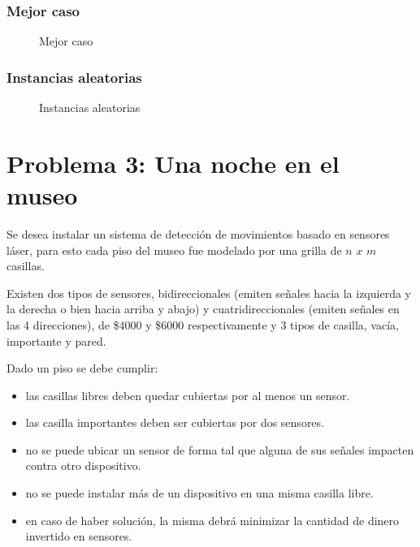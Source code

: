 \documentclass[a4paper, 10pt, twoside]{article}
\newcommand{\tresgraficos}[3]{
    \newcommand{\separacion}{-2.2em}
    \vspace{\separacion}
    
    \vspace{\separacion}
    
    \vspace{\separacion}
    
}
\begin{document}
\subsubsection{Mejor caso}

\begin{figure}[H]
  \centering
  \tresgraficos{problema2-mejor-caso}
               {problema2-mejor-caso-logn}
               {problema2-mejor-caso-n}
  \caption{Mejor caso}
\end{figure}


\subsubsection{Instancias aleatorias}

\begin{figure}[H]
  \centering
  \tresgraficos{problema2-instancias-aleatorias}
               {problema2-instancias-aleatorias-logn}
               {problema2-instancias-aleatorias-n}
  \caption{Instancias aleatorias}
\end{figure}




\newpage

\section{Problema 3: Una noche en el museo}
Se desea instalar un sistema de detección de movimientos basado en sensores láser, para esto cada piso del museo fue modelado por una grilla de $n$ $x$ $m$ casillas.

Existen dos tipos de sensores, bidireccionales (emiten señales hacia la izquierda y la derecha o bien hacia arriba y abajo) y cuatridireccionales (emiten señales en las 4 direcciones), de \$4000 y \$6000 respectivamente y 3 tipos de casilla, vacía, importante y pared.

Dado un piso se debe cumplir:

\begin{itemize}
\item las casillas libres deben quedar cubiertas por al menos un sensor.
\item las casilla importantes deben ser cubiertas por dos sensores.
\item no se puede ubicar un sensor de forma tal que alguna de sus señales impacten contra otro dispositivo.
\item no se puede instalar más de un dispositivo en una misma casilla libre.
\item en caso de haber solución, la misma debrá minimizar la cantidad de dinero invertido en sensores.
\end{itemize}
\end{document}
